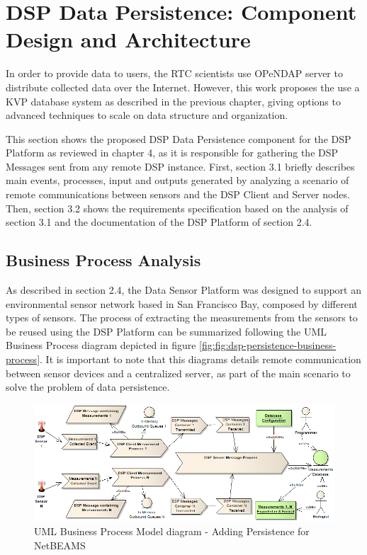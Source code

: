 

\chapter{DSP Data Persistence: Component Design and Architecture}

In order to provide data to users, the RTC scientists use OPeNDAP \cite{opendap}
server to distribute collected data over the Internet. However, this work
proposes the use a KVP database system as described in the previous chapter,
giving options to advanced techniques to scale on data structure and
organization.

This section shows the proposed DSP Data Persistence component for the DSP
Platform as reviewed in chapter 4, as it is responsible for gathering
the DSP Messages sent from any remote DSP instance. First, section 3.1 briefly
describes main events, processes, input and outputs generated by analyzing a
scenario of remote communications between sensors and the DSP Client and
Server nodes. Then, section 3.2 shows the requirements specification based on
the analysis of section 3.1 and the documentation of the DSP Platform of
section 2.4.

\section{Business Process Analysis}

As described in section 2.4, the Data Sensor Platform was designed to support
an environmental sensor network based in San Francisco Bay, composed by
different types of sensors. The process of extracting the measurements from the
sensors to be reused using the DSP Platform can be summarized following the UML
Business Process diagram depicted in figure
\ref{fig:fig:dsp-persistence-business-process}. It is important to note that
this diagrams details remote communication between sensor devices and a
centralized server, as part of the main scenario to solve the problem of data
persistence.

\begin{figure}[!b]
  \centering
  \includegraphics[scale=0.5]{../diagrams/DSP-DataPersistence-Business-Diagram}
  \caption{UML Business Process Model diagram - Adding Persistence for NetBEAMS}
  \label{fig:dsp-persistence-business-process}
\end{figure}

